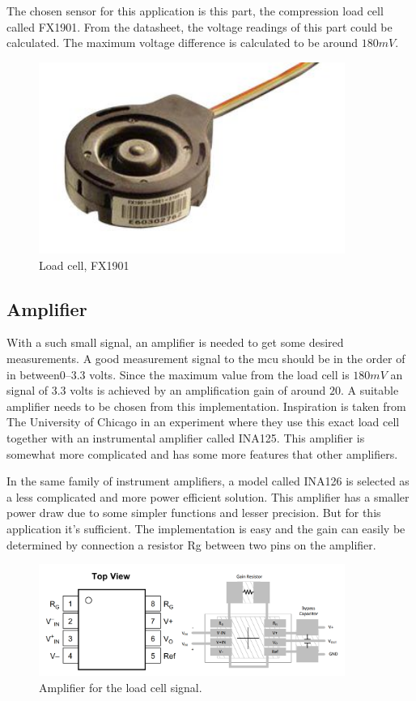 The chosen sensor for this application is this part, the compression load cell called FX1901\cite{load_cell}.  
From the datasheet, the voltage readings of this part could be calculated. The maximum voltage difference is calculated to be around $180mV$. 

\begin{figure}[H]
\begin{center}
	\includegraphics[width = 10cm]{Figures/Load_cell.png}
	\caption{Load cell, FX1901}
	\label{Load_cell}
\end{center}
\end{figure}


\subsection{Amplifier}
With a such small signal, an amplifier is needed to get some desired measurements. A good measurement signal to the \gls{mcu} should be in the order of in between$0–3.3$ volts. Since the maximum value from the load cell is $180mV$ an signal of $3.3$ volts is achieved by an amplification gain of around $20$.  
A suitable amplifier needs to be chosen from this implementation. Inspiration is taken from The University of Chicago\cite{UoC} in an experiment where they use this exact load cell together with an instrumental amplifier called INA125. This amplifier is somewhat more complicated and has some more features that other amplifiers.  

In the same family of instrument amplifiers, a model called INA126\cite{ina_126} is selected as a less complicated and more power efficient solution.  
This amplifier has a smaller power draw due to some simpler functions and lesser precision. But for this application it's sufficient.  
The implementation is easy and the gain can easily be determined by connection a resistor Rg between two pins on the amplifier. 

\begin{figure}[H]
\begin{center}
	\includegraphics[width = 10cm]{Figures/INA126_pinout.png}
	\caption{Amplifier for the load cell signal.}
	\label{INA126}
\end{center}
\end{figure}

